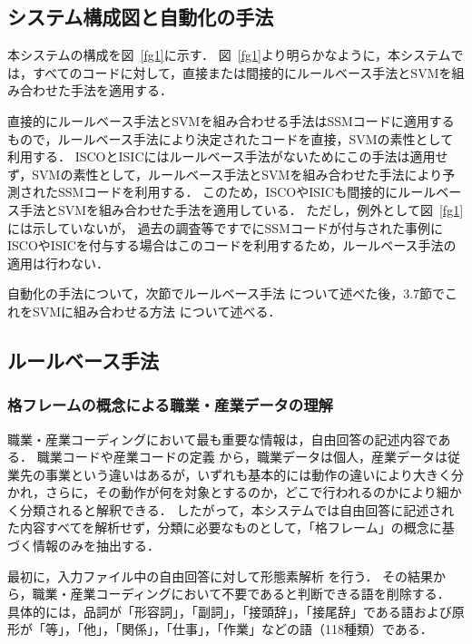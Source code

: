 \documentclass[japanese]{jnlp_1.4}
\begin{document}
\subsection{システム構成図と自動化の手法}

本システムの構成を図~\ref{fg1}に示す．
図~\ref{fg1}より明らかなように，本システムでは，すべてのコードに対して，直接または間接的にルールベース手法とSVMを組み合わせた手法を適用する．

直接的にルールベース手法とSVMを組み合わせる手法はSSMコードに適用するもので，ルールベース手法により決定されたコードを直接，SVMの素性として利用する．  
ISCOとISICにはルールベース手法がないためにこの手法は適用せず，SVMの素性として，ルールベース手法とSVMを組み合わせた手法により予測されたSSMコードを利用する．
このため，ISCOやISICも間接的にルールベース手法とSVMを組み合わせた手法を適用している．
ただし，例外として図~\ref{fg1}には示していないが， 過去の調査等ですでにSSMコードが付与された事例にISCOやISICを付与する場合はこのコードを利用するため，ルールベース手法の適用は行わない．

自動化の手法について，次節でルールベース手法 \cite{Takahashi00}について述べた後，3.7節でこれをSVMに組み合わせる方法 \cite{Takahashi_et_al05c}について述べる．


\subsection{ルールベース手法}

\subsubsection{格フレームの概念による職業・産業データの理解}

職業・産業コーディングにおいて最も重要な情報は，自由回答の記述内容である．
職業コードや産業コードの定義 \cite{SSM95}から，職業データは個人，産業データは従業先の事業という違いはあるが，いずれも基本的には動作の違いにより大きく分かれ，さらに，その動作が何を対象とするのか，どこで行われるのかにより細かく分類されると解釈できる．
したがって，本システムでは自由回答に記述された内容すべてを解析せず，分類に必要なものとして，「格フレーム」の概念に基づく情報のみを抽出する．

最初に，入力ファイル中の自由回答に対して形態素解析 \cite{Kurohashi98}を行う．
その結果から，職業・産業コーディングにおいて不要であると判断できる語を削除する．
具体的には，品詞が「形容詞」，「副詞」，「接頭辞」，「接尾辞」である語および原形が「等」，「他」，「関係」，「仕事」，「作業」などの語（118種類）である．
\end{document}
